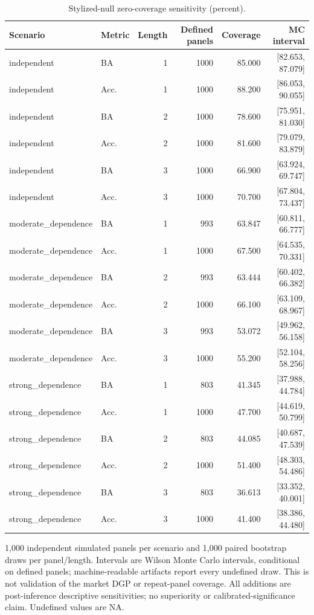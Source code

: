 \begin{table}[htbp]
\centering\small
\caption{Stylized-null zero-coverage sensitivity (percent).}
\label{tab:d205_null}
\setlength{\tabcolsep}{3.5pt}
\begin{tabular}{llrrrr}
\hline
Scenario & Metric & Length & Defined panels & Coverage & MC interval \\
\hline
independent & BA & 1 & 1000 & 85.000 & [82.653, 87.079] \\
independent & Acc. & 1 & 1000 & 88.200 & [86.053, 90.055] \\
independent & BA & 2 & 1000 & 78.600 & [75.951, 81.030] \\
independent & Acc. & 2 & 1000 & 81.600 & [79.079, 83.879] \\
independent & BA & 3 & 1000 & 66.900 & [63.924, 69.747] \\
independent & Acc. & 3 & 1000 & 70.700 & [67.804, 73.437] \\
moderate\_dependence & BA & 1 & 993 & 63.847 & [60.811, 66.777] \\
moderate\_dependence & Acc. & 1 & 1000 & 67.500 & [64.535, 70.331] \\
moderate\_dependence & BA & 2 & 993 & 63.444 & [60.402, 66.382] \\
moderate\_dependence & Acc. & 2 & 1000 & 66.100 & [63.109, 68.967] \\
moderate\_dependence & BA & 3 & 993 & 53.072 & [49.962, 56.158] \\
moderate\_dependence & Acc. & 3 & 1000 & 55.200 & [52.104, 58.256] \\
strong\_dependence & BA & 1 & 803 & 41.345 & [37.988, 44.784] \\
strong\_dependence & Acc. & 1 & 1000 & 47.700 & [44.619, 50.799] \\
strong\_dependence & BA & 2 & 803 & 44.085 & [40.687, 47.539] \\
strong\_dependence & Acc. & 2 & 1000 & 51.400 & [48.303, 54.486] \\
strong\_dependence & BA & 3 & 803 & 36.613 & [33.352, 40.001] \\
strong\_dependence & Acc. & 3 & 1000 & 41.400 & [38.386, 44.480] \\
\hline
\end{tabular}
\par\smallskip\footnotesize 1,000 independent simulated panels per scenario and 1,000 paired bootstrap draws per panel/length. Intervals are Wilson Monte Carlo intervals, conditional on defined panels; machine-readable artifacts report every undefined draw. This is not validation of the market DGP or repeat-panel coverage. All additions are post-inference descriptive sensitivities; no superiority or calibrated-significance claim. Undefined values are NA.
\end{table}
